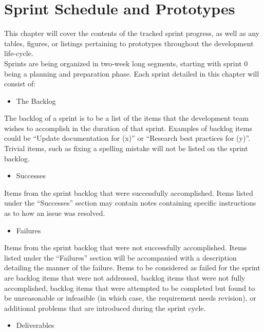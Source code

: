 
\chapter{Sprint Schedule and Prototypes}    
    \hspace{7mm}This chapter will cover the contents of the tracked sprint progress, as well as any tables, figures, or listings
    pertaining to prototypes throughout the development life-cycle.\\

    Sprints are being organized in two-week long segments, starting with sprint 0 being a planning and preparation phase.
    Each sprint detailed in this chapter will consist of:
    \begin{itemize} \item The Backlog \end{itemize}
    
        The backlog of a sprint is to be a list of the items that the development team wishes to accomplish in the duration
        of that sprint. Examples of backlog items could be ``Update documentation for (x)'' or ``Research best practices for (y)''.
        Trivial items, such as fixing a spelling mistake will not be listed on the sprint backlog.\\

    \begin{itemize} \item Successes \end{itemize}
        
        Items from the sprint backlog that were successfully accomplished.  Items listed under the ``Successes'' section
        may contain notes containing specific instructions as to how an issue was resolved.\\

    \begin{itemize} \item Failures \end{itemize}
        
        Items from the sprint backlog that were not successfully accomplished.  Items listed under the ``Failures'' section
        will be accompanied with a description detailing the manner of the failure.  Items to be considered as failed for the
        sprint are backlog items that were not addressed, backlog items that were not fully accomplished, backlog items that
        were attempted to be completed but found to be unreasonable or infeasible (in which case, the requirement needs revision),
        or additional problems that are introduced during the sprint cycle.\\
    \begin{itemize} \item Deliverables \end{itemize}
        
